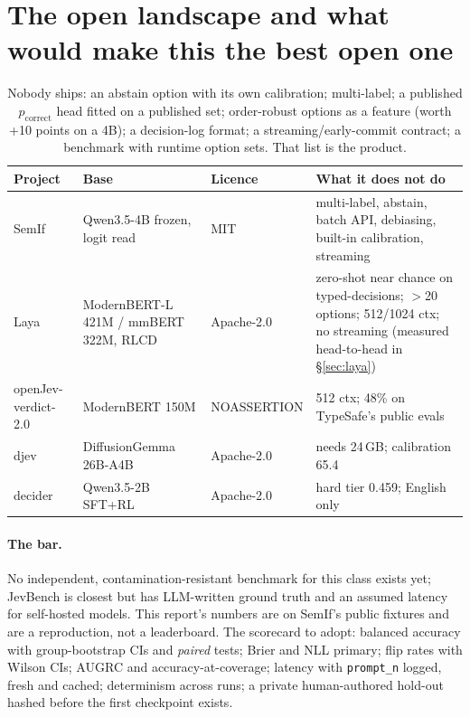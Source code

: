 \documentclass[11pt,a4paper]{article}
\newcommand{\code}[1]{\texttt{#1}}
\begin{document}
\section{The open landscape and what would make this the best open one}
\label{sec:landscape}
\begin{table}[H]
\centering\small
\begin{tabularx}{\textwidth}{l l l X}
\toprule
Project & Base & Licence & What it does not do \\
\midrule
SemIf & Qwen3.5-4B frozen, logit read & MIT & multi-label, abstain, batch API, debiasing, built-in calibration, streaming \\
Laya & ModernBERT-L 421M / mmBERT 322M, RLCD & Apache-2.0 & zero-shot near chance on typed-decisions; $>$20 options; 512/1024 ctx; no streaming (measured head-to-head in \S\ref{sec:laya}) \\
openJev-verdict-2.0 & ModernBERT 150M & NOASSERTION & 512 ctx; 48\% on TypeSafe's public evals \\
djev & DiffusionGemma 26B-A4B & Apache-2.0 & needs 24\,GB; calibration 65.4 \\
decider & Qwen3.5-2B SFT+RL & Apache-2.0 & hard tier 0.459; English only \\
\bottomrule
\end{tabularx}
\caption{Nobody ships: an abstain option with its own calibration; multi-label; a published $p_\text{correct}$ head fitted on a published set; order-robust options as a feature (worth +10 points on a 4B); a decision-log format; a streaming/early-commit contract; a benchmark with runtime option sets. That list is the product.}
\end{table}

\paragraph{The bar.} No independent, contamination-resistant benchmark for this class exists yet; JevBench is closest but has LLM-written ground truth and an assumed latency for self-hosted models. This report's numbers are on SemIf's public fixtures and are a reproduction, not a leaderboard. The scorecard to adopt: balanced accuracy with group-bootstrap CIs and \emph{paired} tests; Brier and NLL primary; flip rates with Wilson CIs; AUGRC and accuracy-at-coverage; latency with \code{prompt\_n} logged, fresh and cached; determinism across runs; a private human-authored hold-out hashed before the first checkpoint exists.
\end{document}
